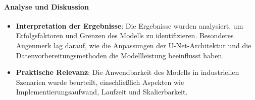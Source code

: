 \paragraph{Analyse und Diskussion}
\begin{itemize} 

\item \textbf{Interpretation der Ergebnisse}: Die Ergebnisse wurden analysiert, um Erfolgsfaktoren und Grenzen des Modells zu identifizieren. Besonderes Augenmerk lag darauf, wie die Anpassungen der U-Net-Architektur und die Datenvorbereitungsmethoden die Modellleistung beeinflusst haben.

\item \textbf{Praktische Relevanz}: Die Anwendbarkeit des Modells in industriellen Szenarien wurde beurteilt, einschließlich Aspekten wie Implementierungsaufwand, Laufzeit und Skalierbarkeit.

\end{itemize}
    
